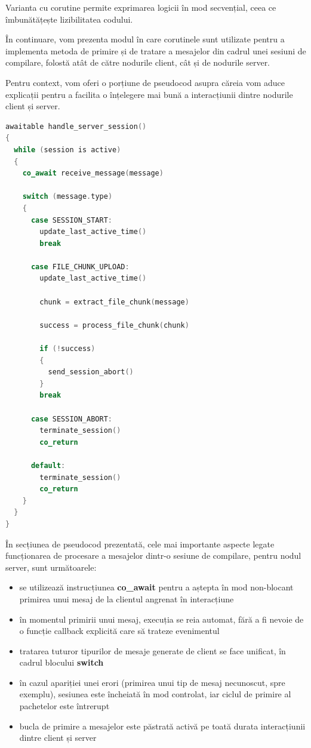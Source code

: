 Varianta cu corutine permite exprimarea logicii în mod secvențial, ceea ce îmbunătățește lizibilitatea codului.

În continuare, vom prezenta modul în care corutinele sunt utilizate pentru a implementa metoda
de primire și de tratare a mesajelor din cadrul unei sesiuni de compilare, folostă atât de către nodurile client, 
cât și de nodurile server. 

Pentru context, vom oferi o porțiune de pseudocod asupra căreia vom aduce explicații pentru a facilita o înțelegere
mai bună a interacțiunii dintre nodurile client și server.

\newpage

\begin{lstlisting}[language=C++, caption={Ciclul de procesare a mesajelor pentru nodul server}]
awaitable handle_server_session()
{
  while (session is active)
  {
    co_await receive_message(message)

    switch (message.type)
    {
      case SESSION_START:
        update_last_active_time()
        break

      case FILE_CHUNK_UPLOAD:
        update_last_active_time()

        chunk = extract_file_chunk(message)

        success = process_file_chunk(chunk)

        if (!success)
        {
          send_session_abort()
        }
        break

      case SESSION_ABORT:
        terminate_session()
        co_return

      default:
        terminate_session()
        co_return
    }
  }
}
\end{lstlisting}

\newpage

În secțiunea de pseudocod prezentată, cele mai importante aspecte legate funcționarea de procesare a mesajelor 
dintr-o sesiune de compilare, pentru nodul server, sunt următoarele:

\begin{itemize}
    \item se utilizează instrucțiunea \textbf{co\_await} pentru a aștepta în mod non-blocant primirea unui mesaj
    de la clientul angrenat în interacțiune
    \item în momentul primirii unui mesaj, execuția se reia automat, fără a fi nevoie de o funcție callback explicită
    care să trateze evenimentul
    \item tratarea tuturor tipurilor de mesaje generate de client se face unificat, în cadrul blocului \textbf{switch}
    \item în cazul apariției unei erori (primirea unui tip de mesaj necunoscut, spre exemplu), sesiunea este încheiată
    în mod controlat, iar ciclul de primire al pachetelor este întrerupt
    \item bucla de primire a mesajelor este păstrată activă pe toată durata interacțiunii dintre client și server
\end{itemize}
